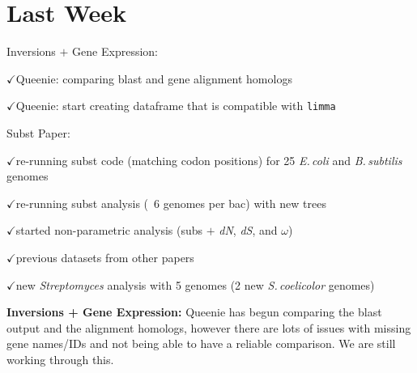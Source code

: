 \documentclass[12pt]{article}
\newcommand{\strep}{\textit{Streptomyces}\xspace}
\newcommand{\bass}{\textit{B.\,subtilis}\xspace}
\newcommand{\ecol}{\textit{E.\,coli}\xspace}
\newcommand{\scoe}{\textit{S.\,coelicolor}\xspace}
\newcommand{\ch}{$\checkmark$}
\newcommand{\dn}{\textit{dN}\xspace}
\newcommand{\ds}{\textit{dS}\xspace}
\begin{document}

	
\section*{Last Week}

Inversions $+$ Gene Expression:

\ch Queenie: comparing blast and gene alignment homologs

\ch Queenie: start creating dataframe that is compatible with \texttt{limma}

Subst Paper:

\ch re-running subst code (matching codon positions) for 25 \ecol and \bass genomes

\ch re-running subst analysis (~6 genomes per bac) with new trees

\ch started non-parametric analysis (subs $+$ \dn, \ds, and $\omega$)

\ch previous datasets from other papers

\ch new \strep analysis with 5 genomes (2 new \scoe genomes)





\textbf{Inversions + Gene Expression:}
Queenie has begun comparing the blast output and the alignment homologs, however there are lots of issues with missing gene names/IDs and not being able to have a reliable comparison.
We are still working through this.
\end{document}
